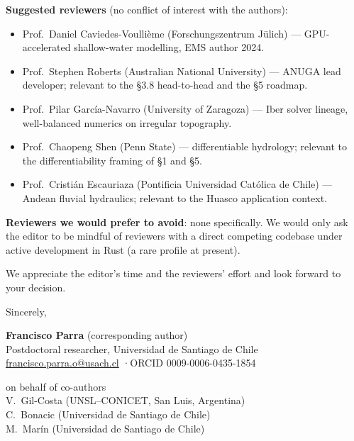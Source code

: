 \documentclass[11pt]{article}
\begin{document}
\textbf{Suggested reviewers} (no conflict of interest with the
authors):
\begin{itemize}
\item Prof.\ Daniel Caviedes-Voullième (Forschungszentrum Jülich) ---
GPU-accelerated shallow-water modelling, EMS author 2024.
\item Prof.\ Stephen Roberts (Australian National University) ---
ANUGA lead developer; relevant to the §3.8 head-to-head and the §5
roadmap.
\item Prof.\ Pilar García-Navarro (University of Zaragoza) --- Iber
solver lineage, well-balanced numerics on irregular topography.
\item Prof.\ Chaopeng Shen (Penn State) --- differentiable hydrology;
relevant to the differentiability framing of §1 and §5.
\item Prof.\ Cristián Escauriaza (Pontificia Universidad Católica de
Chile) --- Andean fluvial hydraulics; relevant to the Huasco
application context.
\end{itemize}

\textbf{Reviewers we would prefer to avoid}: none specifically. We
would only ask the editor to be mindful of reviewers with a direct
competing codebase under active development in Rust (a rare profile
at present).

We appreciate the editor's time and the reviewers' effort and look
forward to your decision.

\medskip
Sincerely,

\medskip
\noindent
\textbf{Francisco Parra} (corresponding author)\\
Postdoctoral researcher, Universidad de Santiago de Chile\\
\href{mailto:francisco.parra.o@usach.cl}{francisco.parra.o@usach.cl}
\quad·\quad ORCID 0009-0006-0435-1854

\medskip
\noindent
on behalf of co-authors\\
V.~Gil-Costa (UNSL--CONICET, San Luis, Argentina)\\
C.~Bonacic (Universidad de Santiago de Chile)\\
M.~Marín (Universidad de Santiago de Chile)
\end{document}

